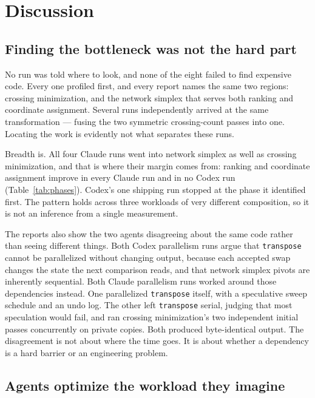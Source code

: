 \section{Discussion}
\label{sec:discussion}

\subsection{Finding the bottleneck was not the hard part}

No run was told where to look, and none of the eight failed to find expensive
code. Every one profiled first, and every report names the same two regions:
crossing minimization, and the network simplex that serves both ranking and
coordinate assignment. Several runs independently arrived at the same
transformation --- fusing the two symmetric crossing-count passes into one.
Locating the work is evidently not what separates these runs.

Breadth is. All four Claude runs went into network simplex as well as crossing
minimization, and that is where their margin comes from: ranking and coordinate
assignment improve in every Claude run and in no Codex run
(Table~\ref{tab:phases}). Codex's one shipping run stopped at the phase it
identified first. The pattern holds across three workloads of very different
composition, so it is not an inference from a single measurement.

The reports also show the two agents disagreeing about the same code rather than
seeing different things. Both Codex parallelism runs argue that
\texttt{transpose} cannot be parallelized without changing output, because each
accepted swap changes the state the next comparison reads, and that network
simplex pivots are inherently sequential. Both Claude parallelism runs
worked around those dependencies instead. One parallelized \texttt{transpose}
itself, with a speculative sweep schedule and an undo log. The other left
\texttt{transpose} serial, judging that most speculation would fail, and ran
crossing minimization's two independent initial passes concurrently on private
copies. Both produced byte-identical output. The disagreement is not about
where the time goes. It is about whether a dependency is a hard barrier or an
engineering problem.

\subsection{Agents optimize the workload they imagine}

